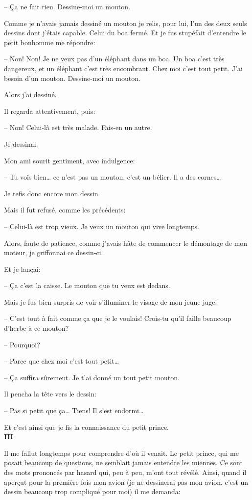 \begin{Parallel}[p]{}{}
{-- Ça ne fait rien. Dessine-moi un mouton.

Comme je n'avais jamais dessiné un mouton je relis, pour lui, l'un des deux seuls dessins dont j'étais capable. Celui du boa fermé. Et je fus stupéfait d'entendre le
petit bonhomme me répondre:

-- Non! Non! Je ne veux pas d'un
éléphant dans un boa. Un boa c'est
très dangereux, et un éléphant c'est très encombrant. Chez moi c'est tout petit. J'ai besoin d'un
mouton. Dessine-moi un mouton.

Alors j'ai dessiné.

Il regarda attentivement, puis:

-- Non! Celui-là est très malade. Fais-en un autre.

Je dessinai.

Mon ami sourit gentiment, avec
indulgence:

-- Tu vois bien\ldots{} ce n'est pas un mouton, c'est un
bélier. Il a des cornes\ldots{}

Je refis donc encore mon dessin.

Mais il fut refusé, comme les précédents:

-- Celui-là est trop vieux. Je veux un
mouton qui vive longtemps.

Alors, faute de patience, comme
j'avais hâte de commencer le démontage de mon moteur, je griffonnai ce
dessin-ci.

Et je lançai:

-- Ça c'est la caisse. Le mouton que tu
veux est dedans.

Mais je fus bien surpris de voir s'illuminer le
visage de mon jeune juge:

-- C'est tout à fait comme ça que je le voulais!
Crois-tu qu'il faille beaucoup d'herbe à ce mouton?

-- Pourquoi?

-- Parce que chez moi c'est tout petit\ldots{}

-- Ça suffira sûrement. Je t'ai donné un tout
petit mouton.

Il pencha la tête vers le dessin:

-- Pas si petit que ça\ldots{} Tiens! Il s'est endormi\ldots{}

Et c'est ainsi que je fis la connaissance du petit
prince.\\

\textbf{III}

Il me fallut longtemps pour comprendre d'où il
venait. Le petit prince, qui me posait beaucoup de
questions, ne semblait jamais entendre les miennes.
Ce sont des mots prononcés par hasard qui, peu à
peu, m'ont tout révélé. Ainsi, quand il aperçut
pour la première fois mon avion (je ne dessinerai
pas mon avion, c'est un dessin beaucoup trop
compliqué pour moi) il me demanda:

}
\end{Parallel}
